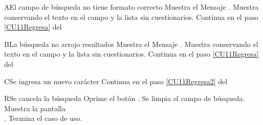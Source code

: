
\begin{UCtrayectoriaA}{A}{El campo de búsqueda no tiene formato correcto}
    \UCpaso Muestra el Mensaje \textbf{}.
    \UCpaso Muestra  conservando el texto en el campo y la lista sin cuestionarios.
	\UCpaso Continua en el paso \ref{CU11Regresa} del 
\end{UCtrayectoriaA}
		
\begin{UCtrayectoriaA}{B}{La búsqueda no arrojo resultados}
    \UCpaso Muestra el Mensaje \textbf{}.
    \UCpaso Muestra  conservando el texto en el campo y la lista sin cuestionarios.
	\UCpaso Continua en el paso \ref{CU11Regresa} del 	
\end{UCtrayectoriaA}

\begin{UCtrayectoriaA}{C}{Se ingresa un nuevo carácter}
    \UCpaso Continua en el paso \ref{CU11Regresa2} del 
\end{UCtrayectoriaA}

\begin{UCtrayectoriaA}{R}{Se cancela la búsqueda}
	\UCpaso[\UCactor] Oprime el botón .
	\UCpaso Se limpia el campo de búsqueda.
	\UCpaso Muestra la pantalla \\.
	\UCpaso Termina el caso de uso.
\end{UCtrayectoriaA}
